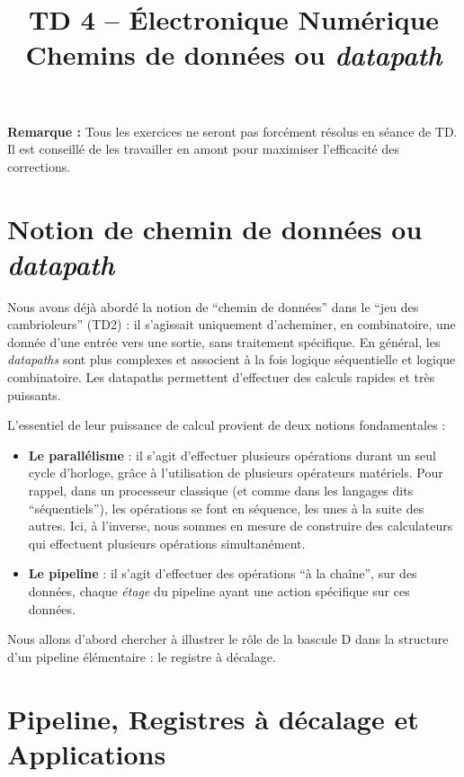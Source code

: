 \documentclass[a4paper,11pt]{article}
\title{\textcolor{primary}{\Huge\bfseries TD 4 -- Électronique Numérique}\\[0.5em] \Large Chemins de données ou \textit{datapath}}
\author{}
\date{}
\begin{document}
\maketitle
\vspace{-2em}

\begin{notebox}
\textbf{Remarque :} Tous les exercices ne seront pas forcément résolus en séance de TD. Il est conseillé de les travailler en amont pour maximiser l'efficacité des corrections.
\end{notebox}

\vspace{1em}

\section{Notion de chemin de données ou \textit{datapath}}

Nous avons déjà abordé la notion de ``chemin de données'' dans le ``jeu des cambrioleurs'' (TD2) : il s'agissait uniquement d'acheminer, en combinatoire, une donnée d'une entrée vers une sortie, sans traitement spécifique. En général, les \textit{datapaths} sont plus complexes et associent à la fois logique séquentielle et logique combinatoire. Les datapaths permettent d'effectuer des calculs rapides et très puissants.

L'essentiel de leur puissance de calcul provient de deux notions fondamentales :
\begin{itemize}
    \item \textbf{Le parallélisme} : il s'agit d'effectuer plusieurs opérations durant un seul cycle d'horloge, grâce à l'utilisation de plusieurs opérateurs matériels. Pour rappel, dans un processeur classique (et comme dans les langages dits ``séquentiels''), les opérations se font en séquence, les unes à la suite des autres. Ici, à l'inverse, nous sommes en mesure de construire des calculateurs qui effectuent plusieurs opérations simultanément.
    \item \textbf{Le pipeline} : il s'agit d'effectuer des opérations ``à la chaîne'', sur des données, chaque \textit{étage} du pipeline ayant une action spécifique sur ces données.
\end{itemize}

Nous allons d'abord chercher à illustrer le rôle de la bascule D dans la structure d'un pipeline élémentaire : le registre à décalage.

\section{Pipeline, Registres à décalage et Applications}
\end{document}
